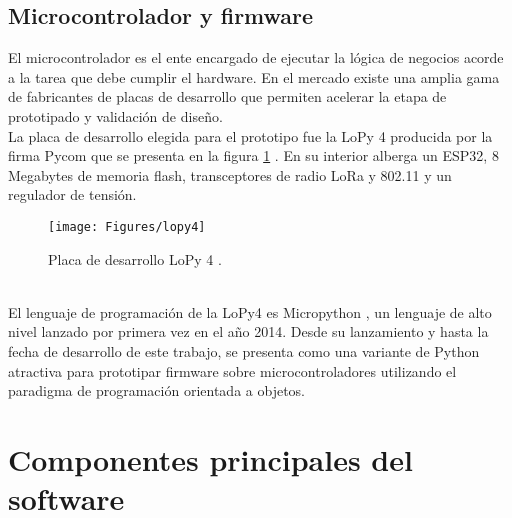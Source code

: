 \subsection{Microcontrolador y firmware}
El microcontrolador es el ente encargado de ejecutar la lógica de negocios acorde a la tarea que debe cumplir el hardware. En el mercado existe una amplia gama de fabricantes de placas de desarrollo que permiten acelerar la etapa de prototipado y validación de diseño.\\
La placa de desarrollo elegida para el prototipo fue la LoPy 4 producida por la firma Pycom que se presenta en la figura \ref{fig:lopy4} . En su interior alberga un ESP32, 8 Megabytes de memoria flash, transceptores de radio LoRa y 802.11 y un regulador de tensión.\\
\begin{figure}[h]
	\centering
	\texttt{[image: Figures/lopy4]}
	\caption{Placa de desarrollo LoPy 4 \citep{lopy4}.}
	\label{fig:lopy4}
\end{figure}\\
El lenguaje de programación de la LoPy4 es Micropython \citep{micropy}, un lenguaje de alto nivel lanzado por primera vez en el año 2014. Desde su lanzamiento y hasta la fecha de desarrollo de este trabajo, se presenta como una variante de Python atractiva para prototipar firmware sobre microcontroladores utilizando el paradigma de programación orientada a objetos.\\


\section{Componentes principales del software}
